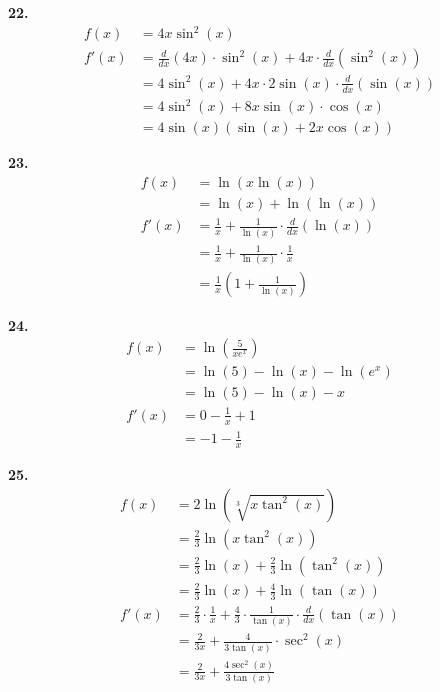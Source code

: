 \documentclass[10pt,oneside,]{book}
\theoremstyle{plain}
\theoremstyle{definition}
\numberwithin{equation}{section}
\newcommand{\fe}[2]{#1\mathopen{}\left(#2\right)\mathclose{}}
\newcommand{\fd}[1]{#1'}
\newcommand{\lzoo}[2]{{\frac{d}{d#1}}{\left(#2\right)}}
\begin{document}
\noindent\textbf{22.}\quad{}\begin{align*}
\fe{f}{x}&=4x\fe{\sin^2}{x}\\
\fe{\fd{f}}{x}&=\lzoo{x}{4x}\cdot\fe{\sin^2}{x}+4x\cdot\lzoo{x}{\fe{\sin^2}{x}}\\
&=4\fe{\sin^2}{x}+4x\cdot2\fe{\sin}{x}\cdot\lzoo{x}{\fe{\sin}{x}}\\
&=4\fe{\sin^2}{x}+8x\fe{\sin}{x}\cdot\fe{\cos}{x}\\
&=4\fe{\sin}{x}\left(\fe{\sin}{x}+2x\fe{\cos}{x}\right)
\end{align*}%
\par\smallskip
\noindent\textbf{23.}\quad{}\begin{align*}
\fe{f}{x}&=\fe{\ln}{x\fe{\ln}{x}}\\
&=\fe{\ln}{x}+\fe{\ln}{\fe{\ln}{x}}\\
\fe{\fd{f}}{x}&=\frac{1}{x}+\frac{1}{\fe{\ln}{x}}\cdot\lzoo{x}{\fe{\ln}{x}}\\
&=\frac{1}{x}+\frac{1}{\fe{\ln}{x}}\cdot\frac{1}{x}\\
&=\frac{1}{x}\left(1+\frac{1}{\fe{\ln}{x}}\right)
\end{align*}%
\par\smallskip
\noindent\textbf{24.}\quad{}\begin{align*}
\fe{f}{x}&=\fe{\ln}{\frac{5}{xe^x}}\\
&=\fe{\ln}{5}-\fe{\ln}{x}-\fe{\ln}{e^x}\\
&=\fe{\ln}{5}-\fe{\ln}{x}-x\\
\fe{\fd{f}}{x}&=0-\frac{1}{x}+1\\
&=-1-\frac{1}{x}
\end{align*}%
\par\smallskip
\noindent\textbf{25.}\quad{}\begin{align*}
\fe{f}{x}&=2\fe{\ln}{\sqrt[3]{x\fe{\tan^2}{x}}}\\
&=\frac{2}{3}\fe{\ln}{x\fe{\tan^2}{x}}\\
&=\frac{2}{3}\fe{\ln}{x}+\frac{2}{3}\fe{\ln}{\fe{\tan^2}{x}}\\
&=\frac{2}{3}\fe{\ln}{x}+\frac{4}{3}\fe{\ln}{\fe{\tan}{x}}\\
\fe{\fd{f}}{x}&=\frac{2}{3}\cdot\frac{1}{x}+\frac{4}{3}\cdot\frac{1}{\fe{\tan}{x}}\cdot\lzoo{x}{\fe{\tan}{x}}\\
&=\frac{2}{3x}+\frac{4}{3\fe{\tan}{x}}\cdot\fe{\sec^2}{x}\\
&=\frac{2}{3x}+\frac{4\fe{\sec^2}{x}}{3\fe{\tan}{x}}
\end{align*}%
\par\smallskip
\end{document}
